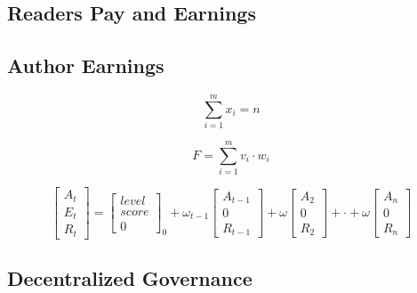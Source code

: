 \documentclass[lettersize,journal]{IEEEtran}
\begin{document}
\subsection{Readers Pay and Earnings}

\subsection{Author Earnings}


\begin{equation}
  \sum_{i = 1}^{m}x_i = n
\end{equation}

\begin{equation}
  F = \sum_{i = 1}^{m}v_i \cdot w_i
\end{equation}

\begin{equation}
  \begin{bmatrix}
    A_t \\
    E_t \\
    R_t 
  \end{bmatrix}
  = 
  \begin{bmatrix}
    level \\
    score \\
    0
  \end{bmatrix}_0
  + 
  \omega_{t-1}
  \begin{bmatrix}
    A_{t-1} \\
    0 \\
    R_{t-1}
  \end{bmatrix}
  +
  \omega
  \begin{bmatrix}
    A_2 \\
    0 \\
    R_2
  \end{bmatrix}
  + 
  \cdot
  + 
  \omega
  \begin{bmatrix}
    A_n \\
    0 \\
    R_n
  \end{bmatrix}
\end{equation}


\subsection{Decentralized Governance}
\end{document}
